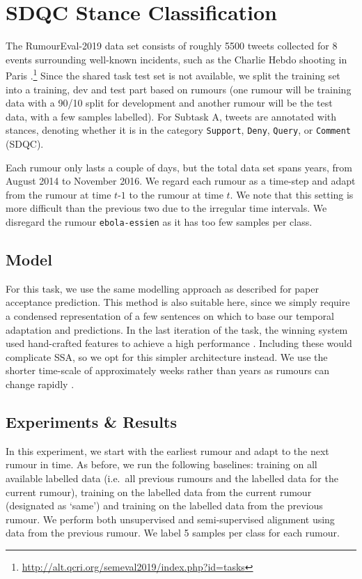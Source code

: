 \documentclass[letterpaper]{article} %
\begin{document}
\section{SDQC Stance Classification}
The RumourEval-2019 data set consists of roughly 5500 tweets collected for 8 events surrounding well-known incidents, such as the Charlie Hebdo shooting in Paris \cite{rumour:19}.\footnote{\url{http://alt.qcri.org/semeval2019/index.php?id=tasks}} 
Since the shared task test set is not available, we split the training set into a training, dev and test part based on rumours (one rumour will be training data with a 90/10 split for development and another rumour will be the test data, with a few samples labelled). For Subtask A, tweets are annotated with stances, denoting whether it is in the category \texttt{Support}, \texttt{Deny}, \texttt{Query}, or \texttt{Comment} (SDQC). 

Each rumour only lasts a couple of days, but the total data set spans years, from August 2014 to November 2016.  We regard each rumour as a time-step and adapt from the rumour at time $t$-$1$ to the rumour at time $t$. We note that this setting is more difficult than the previous two due to the irregular time intervals. We disregard the rumour \texttt{ebola-essien} as it has too few samples per class.

\subsection{Model}
For this task, we use the same modelling approach as described for paper acceptance prediction. %
This method is also suitable here, since we simply require a condensed representation of a few sentences on which to base our temporal adaptation and predictions.
In the last iteration of the task, the winning system used hand-crafted features to achieve a high performance \cite{S17-2083}. Including these would complicate SSA, so we opt for this simpler architecture instead.
We use the shorter time-scale of approximately weeks rather than years as rumours can change rapidly \cite{kwon2017rumor}.

\subsection{Experiments \& Results}
In this experiment, we start with the earliest rumour and adapt to the next rumour in time. As before, we run the following baselines: training on all available labelled data (i.e.~all previous rumours and the labelled data for the current rumour), training on the labelled data from the current rumour (designated as `same') and training on the labelled data from the previous rumour. We perform both unsupervised and semi-supervised alignment using data from the previous rumour. We label 5 samples per class for each rumour.
\end{document}
